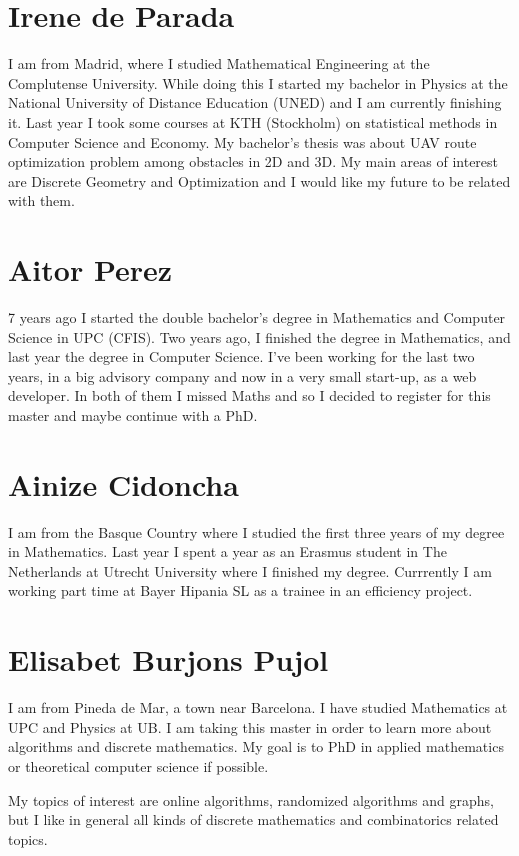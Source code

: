 \documentclass[11pt]{amsart}
\begin{document}
\section*{Irene de Parada}

I am from Madrid, where I studied Mathematical Engineering at the Complutense University. While doing this I started my bachelor in Physics  at the National University of Distance Education (UNED) and I am currently finishing it. Last year I took some courses at KTH (Stockholm) on statistical methods in Computer Science and Economy. My  bachelor's thesis was about UAV route optimization problem  among obstacles in 2D and 3D. My main areas of interest are Discrete Geometry and Optimization and I would like my future to be related with them.

\section*{Aitor Perez}
7 years ago I started the double bachelor's degree in Mathematics and Computer Science in UPC (CFIS). Two years ago, I finished the degree in Mathematics, and last year the degree in Computer Science. I've been working for the last two years, in a big advisory company and now in a very small start-up, as a web developer. In both of them I missed Maths and so I decided to register for this master and maybe continue with a PhD.

\section*{Ainize Cidoncha}
I am from the Basque Country where I studied the first three years of my degree in Mathematics. Last year I spent a year as an Erasmus student in The Netherlands at Utrecht University where I finished my degree. 
Currrently I am working part time at Bayer Hipania SL as a trainee in an efficiency project.

\section*{Elisabet Burjons Pujol}

I am from Pineda de Mar, a town near Barcelona. I have studied Mathematics at UPC and Physics at UB. 
I am taking this master in order to learn more about algorithms and discrete mathematics.
My goal is to PhD in applied mathematics or theoretical computer science if possible.

My topics of interest are online algorithms, randomized algorithms and graphs,
but I like in general all kinds of discrete mathematics and combinatorics related topics.
\end{document}
